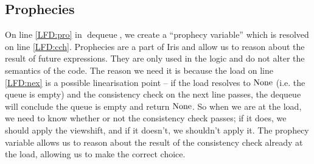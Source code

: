 \documentclass[a4paper, 10pt]{report}
\theoremstyle{definition}
\newcommand{\dequeue}{\operatorname{dequeue}}
\begin{document}
\subsection{Prophecies}
On line \ref{LFD:pro} in $\dequeue$, we create a ``prophecy variable'' which is resolved on line \ref{LFD:cch}. Prophecies are a part of Iris and allow us to reason about the result of future expressions. They are only used in the logic and do not alter the semantics of the code. The reason we need it is because the load on line \ref{LFD:nex} is a possible linearisation point -- if the load resolves to $\operatorname{None}$ (i.e. the queue is empty) and the consistency check on the next line passes, the dequeue will conclude the queue is empty and return $\operatorname{None}$. So when we are at the load, we need to know whether or not the consistency check passes; if it does, we should apply the viewshift, and if it doesn't, we shouldn't apply it. The prophecy variable allows us to reason about the result of the consistency check already at the load, allowing us to make the correct choice.
\end{document}
